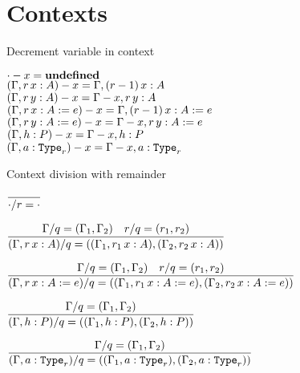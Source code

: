 \section{Contexts}

\begin{frame}{Decrement variable in context}

\begin{center}
  $\cdot - x = \mathbf{undefined}$ \\
  $\usevar{(\extend{\Gamma}[r]{x}{A})}{x} = \extend{\Gamma}[(\subqty{r}{\One})]{x}{A}$ \\
  $\usevar{(\extend{\Gamma}[r]{y}{A})}{x} = \extend{\usevar{\Gamma}{x}}[r]{y}{A}$ \\
  $\usevar{(\extend{\Gamma}[r]{x}{A}[e])}{x} = \extend{\Gamma}[(\subqty{r}{\One})]{x}{A}[e]$ \\
  $\usevar{(\extend{\Gamma}[r]{y}{A}[e])}{x} = \extend{\usevar{\Gamma}{x}}[r]{y}{A}[e]$ \\
  $(\Gamma, h : P) - x = \Gamma - x, h : P$ \\
  $\usevar{(\extendtype{\Gamma}{a}[r])}{x} = \extendtype{\usevar{\Gamma}{x}}{a}[r]$
\end{center}

\end{frame}

\begin{frame}{Context division with remainder}

\begin{center}
  $\infrule{}{\divctx{\emptyctx}{r} = \emptyctx}$

  \vspace{2em}

  $\infrule{\divctx{\Gamma}{q} = (\Gamma_1, \Gamma_2) \quad \divqty{r}{q} = (r_1, r_2)}{\divctx{(\extend{\Gamma}[r]{x}{A})}{q} = ((\extend{\Gamma_1}[r_1]{x}{A}), (\extend{\Gamma_2}[r_2]{x}{A}))}$

  \vspace{2em}

  $\infrule{\divctx{\Gamma}{q} = (\Gamma_1, \Gamma_2) \quad \divqty{r}{q} = (r_1, r_2)}{\divctx{(\extend{\Gamma}[r]{x}{A}[e])}{q} = ((\extend{\Gamma_1}[r_1]{x}{A}[e]), (\extend{\Gamma_2}[r_2]{x}{A}[e]))}$

  \vspace{2em}

  $\infrule{\divctx{\Gamma}{q} = (\Gamma_1, \Gamma_2)}{\divctx{(\assume{\Gamma}{h}{P})}{q} = ((\assume{\Gamma_1}{h}{P}), (\assume{\Gamma_2}{h}{P}))}$

  \vspace{2em}

  $\infrule{\divctx{\Gamma}{q} = (\Gamma_1, \Gamma_2)}{\divctx{(\extendtype{\Gamma}{a}[r])}{q} = ((\extendtype{\Gamma_1}{a}[r]), (\extendtype{\Gamma_2}{a}[r]))}$
\end{center}

\end{frame}
